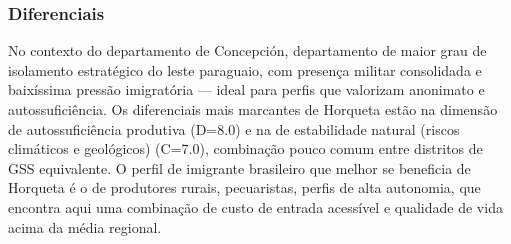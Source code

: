 \subsubsection*{Diferenciais}\label{dif-horqueta-0103}
No contexto do departamento de Concepción, departamento de maior grau de isolamento estratégico do leste paraguaio, com presença militar consolidada e baixíssima pressão imigratória — ideal para perfis que valorizam anonimato e autossuficiência. Os diferenciais mais marcantes de Horqueta estão na dimensão de autossuficiência produtiva (D=8.0) e na de estabilidade natural (riscos climáticos e geológicos) (C=7.0), combinação pouco comum entre distritos de GSS equivalente. O perfil de imigrante brasileiro que melhor se beneficia de Horqueta é o de produtores rurais, pecuaristas, perfis de alta autonomia, que encontra aqui uma combinação de custo de entrada acessível e qualidade de vida acima da média regional.
